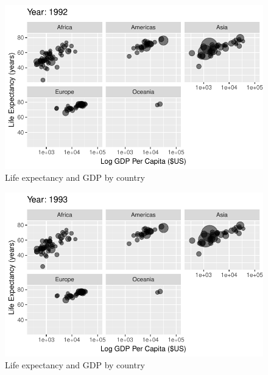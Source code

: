 \documentclass[
  letterpaper,
  DIV=11,
  numbers=noendperiod]{scrreport}
\theoremstyle{definition}
\theoremstyle{remark}
\begin{document}
\begin{figure}

{\centering \includegraphics{index_files/figure-pdf/fig-anim-lifegdp-73.pdf}

}

\caption{\label{fig-anim-lifegdp-73}Life expectancy and GDP by country}

\end{figure}

\begin{figure}

{\centering \includegraphics{index_files/figure-pdf/fig-anim-lifegdp-74.pdf}

}

\caption{\label{fig-anim-lifegdp-74}Life expectancy and GDP by country}

\end{figure}
\end{document}
